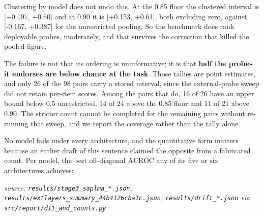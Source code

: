 \documentclass[10pt]{article}
\begin{document}
Clustering by model does not undo this. At the 0.85 floor the clustered interval is [+0.197, +0.60] and at 0.90 it is [+0.153, +0.61], both excluding zero, against [-0.167, +0.387] for the unrestricted pooling. So the benchmark does rank deployable probes, moderately, and that survives the correction that killed the pooled figure.

The failure is not that its ordering is uninformative; it is that \textbf{half the probes it endorses are below chance at the task}. Those tallies are point estimates, and only 26 of the 98 pairs carry a stored interval, since the external-probe sweep did not retain per-item scores. Among the pairs that do, 16 of 26 have an upper bound below 0.5 unrestricted, 14 of 24 above the 0.85 floor and 11 of 21 above 0.90. The stricter count cannot be completed for the remaining pairs without re-running that sweep, and we report the coverage rather than the tally alone.

No model fails under every architecture, and the quantitative form matters because an earlier draft of this sentence claimed the opposite from a fabricated count. Per model, the best off-diagonal AUROC any of its five or six architectures achieves:

{\footnotesize\raggedright\sloppy \emph{source: \texttt{results/stage3\_saplma\_*.json}, \texttt{results/extlayers\_summary\_44b4126cba1c.json}, \texttt{results/drift\_*.json} via \texttt{src/report/d11\_and\_counts.py}}\par}

\begin{table}[H]
\centering
\small
{}
\end{table}
\end{document}
